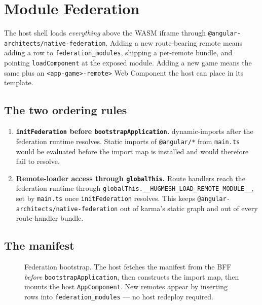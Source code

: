 \chapter{Module Federation}

The host shell loads \emph{everything} above the WASM iframe through
\texttt{@angular-architects/native-federation}. Adding a new
route-bearing remote means adding a row to \texttt{federation\_modules},
shipping a per-remote bundle, and pointing \texttt{loadComponent} at the
exposed module. Adding a new game means the same plus an
\texttt{<app-game>-remote>} Web Component the host can place in its
template.

\section{The two ordering rules}

\begin{enumerate}
  \item \textbf{\texttt{initFederation} before \texttt{bootstrapApplication}.}
         dynamic-imports
         after the federation runtime resolves.
        Static imports of \texttt{@angular/*} from \texttt{main.ts} would
        be evaluated before the import map is installed and would
        therefore fail to resolve.
  \item \textbf{Remote-loader access through \texttt{globalThis}.}
        Route handlers reach the federation runtime through
        \texttt{globalThis.\_\_HUGMESH\_LOAD\_REMOTE\_MODULE\_\_}, set
        by \texttt{main.ts} once \texttt{initFederation} resolves. This
        keeps \texttt{@angular-architects/native-federation} out of
        karma's static graph and out of every route-handler bundle.
\end{enumerate}

\section{The manifest}

\begin{figure}[!h]
\centering
{}
\caption{Federation bootstrap. The host fetches the manifest from the BFF
\emph{before} \texttt{bootstrapApplication}, then constructs the import
map, then mounts the host \texttt{AppComponent}. New remotes appear by
inserting rows into \texttt{federation\_modules} — no host redeploy
required.}
\end{figure}

